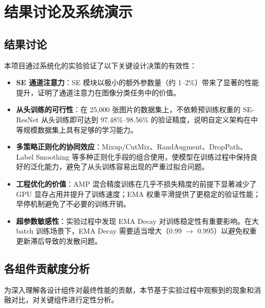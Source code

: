 \documentclass[12pt,a4paper]{ctexart}
\begin{document}
\section{结果讨论及系统演示}

\subsection{结果讨论}

本项目通过系统化的实验验证了以下关键设计决策的有效性：

\begin{itemize}
    \item \textbf{SE 通道注意力}：SE 模块以极小的额外参数量（约 1--2\%）带来了显著的性能提升，证明了通道注意力在图像分类任务中的价值。
    \item \textbf{从头训练的可行性}：在 25,000 张图片的数据集上，不依赖预训练权重的 SE-ResNet 从头训练即可达到 97.48\%--98.56\% 的验证精度，说明自定义架构在中等规模数据集上具有足够的学习能力。
    \item \textbf{多策略正则化的协同效应}：Mixup/CutMix、RandAugment、DropPath、Label Smoothing 等多种正则化手段的组合使用，使模型在训练过程中保持良好的泛化能力，避免了从头训练容易出现的严重过拟合问题。
    \item \textbf{工程优化的价值}：AMP 混合精度训练在几乎不损失精度的前提下显著减少了 GPU 显存占用并提升了训练速度；EMA 权重平滑提供了更稳定的验证性能；早停机制避免了不必要的训练开销。
    \item \textbf{超参数敏感性}：实验过程中发现 EMA Decay 对训练稳定性有重要影响。在大 batch 训练场景下，EMA Decay 需要适当增大（0.99 $\rightarrow$ 0.995）以避免权重更新滞后导致的发散问题。
\end{itemize}

\subsection{各组件贡献度分析}

为深入理解各设计组件对最终性能的贡献，本节基于实验过程中观察到的现象和消融对比，对关键组件进行定性分析。
\end{document}
